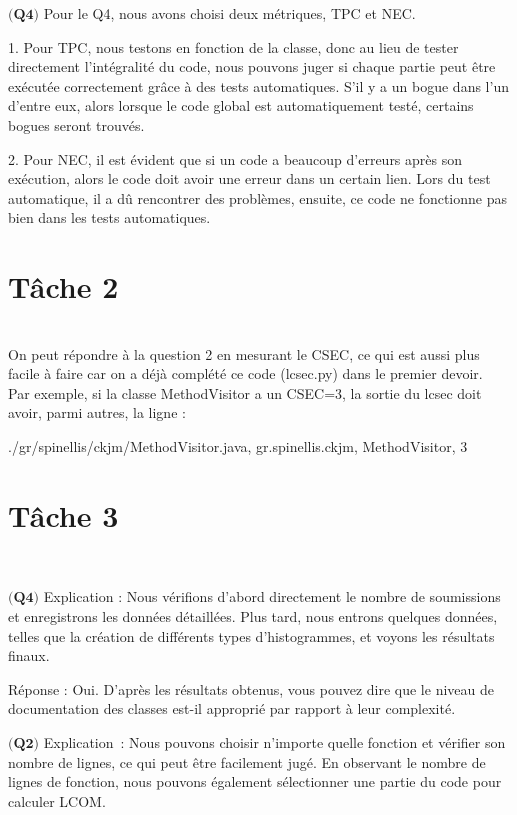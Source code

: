 \documentclass{article}
\begin{document}
\item$\textbf{(Q4)}$
Pour le Q4, nous avons choisi deux métriques, TPC et NEC.

1. Pour TPC, nous testons en fonction de la classe, donc au lieu de tester directement l'intégralité du code, nous pouvons juger si chaque partie peut être exécutée correctement grâce à des tests automatiques. S'il y a un bogue dans l'un d'entre eux, alors lorsque le code global est automatiquement testé, certains bogues seront trouvés.

2. Pour NEC, il est évident que si un code a beaucoup d'erreurs après son exécution, alors le code doit avoir une erreur dans un certain lien. Lors du test automatique, il a dû rencontrer des problèmes, ensuite, ce code ne fonctionne pas bien dans les tests automatiques.\\

\section*{Tâche 2}\\
On peut répondre à la question 2 en mesurant le CSEC, ce qui est aussi plus facile à faire car on a déjà complété ce code (lcsec.py) dans le premier devoir.\\
Par exemple, si la classe MethodVisitor a un CSEC=3, la sortie du lcsec doit avoir, parmi autres, la ligne :

./gr/spinellis/ckjm/MethodVisitor.java, gr.spinellis.ckjm, MethodVisitor, 3\\

\section*{Tâche 3}\\

\item$\textbf{(Q4)}$
Explication : Nous vérifions d'abord directement le nombre de soumissions et enregistrons les données détaillées. Plus tard, nous entrons quelques données, telles que la création de différents types d'histogrammes, et voyons les résultats finaux.

Réponse : Oui. D'après les résultats obtenus, vous pouvez dire que le niveau de documentation des classes est-il approprié par rapport à leur complexité.

\item$\textbf{(Q2)}$
Explication : Nous pouvons choisir n'importe quelle fonction et vérifier son nombre de lignes, ce qui peut être facilement jugé. En observant le nombre de lignes de fonction, nous pouvons également sélectionner une partie du code pour calculer LCOM.
\end{document}
